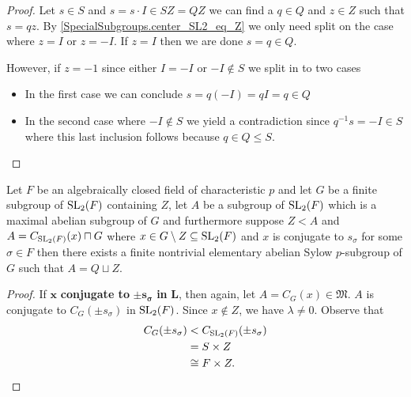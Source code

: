\begin{footnotesize}
\begin{proof}
 Let $s \in S$ and $s = s \cdot I \in S Z = QZ$ we can find a $q \in Q$ and $z \in Z$ such that $s = q z$. By \ref{SpecialSubgroups.center_SL2_eq_Z} 
 we only need split on the case where $z = I$ or $z = -I$. If $z = I$ then we are done $s = q \in Q$. 
 
 However, if $z = -1$ since either $I = -I$ or $-I \notin S$ we split in to two cases
 \begin{itemize}
  \item In the first case we can conclude $s = q (-I) = q I = q \in Q$
  \item In the second case where $-I \notin S$ we yield a contradiction since $q^{-1} s = -I \in S$ where this last inclusion follows because $q \in Q \le S$.
 \end{itemize} 
\end{proof}



\begin{theorem}
\label{MaximalAbelianSubgroup.A_eq_Q_join_Z_of_IsConj_s_or_neg_s}
\leanok
Let $F$ be an algebraically closed field of characteristic $p$ and let $G$ be a finite subgroup of $\operatorname{SL}_2(F)$ containing $Z$, let $A$ be a subgroup of $\operatorname{SL}_2(F)$ which is a maximal abelian subgroup of $G$ and furthermore suppose $Z < A$ and $A = C_{\operatorname{SL}_2(F)}(x) \sqcap G$ where $x \in G \setminus Z \subseteq \operatorname{SL}_2(F)$ and $x$ is conjugate to $s_\sigma$ for some $\sigma \in F$
then there exists a finite nontrivial elementary abelian Sylow $p$-subgroup of $G$ such that $A = Q \sqcup Z$.
\end{theorem}
\begin{proof}
  \leanok
  If $\pmb{x}$ \textbf{conjugate to} $\pmb{\pm s_\sigma}$ \textbf{in} $\pmb{L}$, then again, let $A = C_G(x) \in \mathfrak{M}$. $A$ is conjugate to $C_G({\pm s_\sigma})$ in $\operatorname{SL}_2(F)$. Since $x \notin Z$, we have $\lambda \neq 0$. Observe that
  \begin{align*}  C_G({\pm s_\sigma}) &<  C_{\operatorname{SL}_2(F)}({\pm s_\sigma})
  \\&= S \times Z  
  \\&\cong F \times Z.
  \end{align*}
  

\end{proof}
\end{footnotesize}
